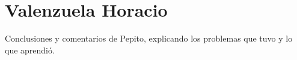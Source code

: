 \section{Valenzuela Horacio}
Conclusiones y comentarios de Pepito, explicando los problemas que tuvo y lo que aprendió.